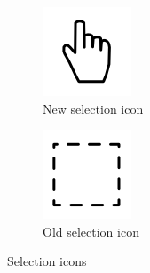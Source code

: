 \begin{figure}[h]
	\begin{subfigure}[b]{0.45\textwidth}
		\centering
		\includegraphics[scale = 1]{media/selectNew}
		\caption{New selection icon}
		\label{figure:new-select}
	\end{subfigure}
	\qquad
	\begin{subfigure}[b]{0.45\textwidth}
		\centering
		\includegraphics[scale = 0.1]{media/selectOld}
		\caption{Old selection icon}
		\label{figure:old-select}
	\end{subfigure}		
	\caption{Selection icons}
	\label{figure:select}
\end{figure}